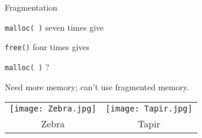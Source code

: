 \documentclass{plt}
\begin{document}
\begin{frame}{Fragmentation}

\texttt{malloc(  )} seven times give


\medskip

\texttt{free()} four times gives


\medskip

\texttt{malloc(  )} ?

Need more memory; can't use fragmented memory.


\begin{tabular}{cc}
  \texttt{[image: Zebra.jpg]}
  &
  \texttt{[image: Tapir.jpg]}
  \\
  Zebra
  &
  Tapir
  \\
\end{tabular}

\end{frame}
\end{document}
